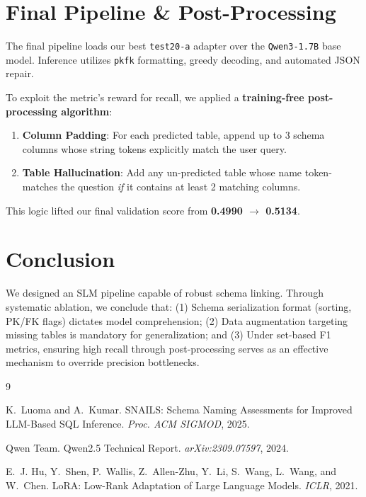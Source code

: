 \documentclass[10pt,twocolumn]{article}
\begin{document}
\section{Final Pipeline \& Post-Processing}
\label{sec:final}

The final pipeline loads our best \texttt{test20-a} adapter over the \texttt{Qwen3-1.7B} base model. Inference utilizes \texttt{pkfk} formatting, greedy decoding, and automated JSON repair.

To exploit the metric's reward for recall, we applied a \textbf{training-free post-processing algorithm}:
\begin{enumerate}[noitemsep]
  \item \textbf{Column Padding}: For each predicted table, append up to 3 schema columns whose string tokens explicitly match the user query.
  \item \textbf{Table Hallucination}: Add any un-predicted table whose name token-matches the question \emph{if} it contains at least 2 matching columns. 
\end{enumerate}

This logic lifted our final validation score from \textbf{0.4990 $\to$ 0.5134}.

\section{Conclusion}
\label{sec:conclusion}
We designed an SLM pipeline capable of robust schema linking. Through systematic ablation, we conclude that: (1) Schema serialization format (sorting, PK/FK flags) dictates model comprehension; (2) Data augmentation targeting missing tables is mandatory for generalization; and (3) Under set-based F1 metrics, ensuring high recall through post-processing serves as an effective mechanism to override precision bottlenecks. 


\begin{thebibliography}{9}

K.~Luoma and A.~Kumar.
\newblock SNAILS: Schema Naming Assessments for Improved LLM-Based SQL Inference.
\newblock \emph{Proc. ACM SIGMOD}, 2025.

Qwen Team.
\newblock Qwen2.5 Technical Report.
\newblock \emph{arXiv:2309.07597}, 2024.

E.~J. Hu, Y.~Shen, P.~Wallis, Z.~Allen-Zhu, Y.~Li, S.~Wang, L.~Wang, and W.~Chen.
\newblock LoRA: Low-Rank Adaptation of Large Language Models.
\newblock \emph{ICLR}, 2021.

\end{thebibliography}
\end{document}
